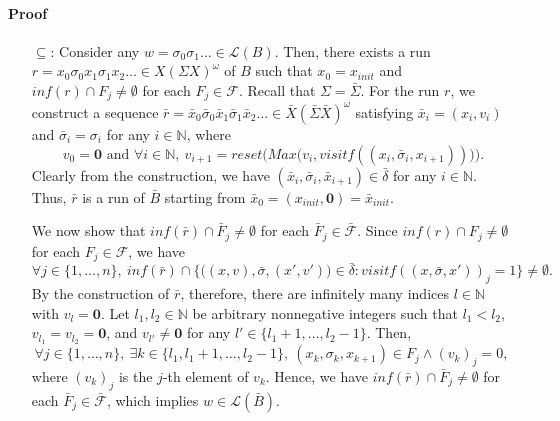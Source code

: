 \paragraph{Proof}
\begin{itemize}
	\item[$ \subseteq $:]
	Consider any $ w = \sigma_0 \sigma_1 \ldots \in \mathcal{L}(B) $.
	Then, there exists a run $ r = x_0 \sigma_0 x_1 \sigma_1 x_2 \ldots \in X(\Sigma X)^\omega $ of $ B $ such that $ x_0 = x_{init} $ and $ inf(r) \cap F_j \neq \emptyset $ for each $ F_j \in \mathcal{F} $.
	Recall that $ \Sigma = \bar{\Sigma} $.
	For the run $ r $, we construct a sequence $ \bar{r} = \bar{x}_0 \bar{\sigma}_0 \bar{x}_1 \bar{\sigma}_1 \bar{x}_2 \ldots \in \bar{X}(\bar{\Sigma} \bar{X})^\omega $ satisfying $ \bar{x}_i = (x_i, {v}_i) $ and $ \bar{\sigma}_i = \sigma_i $ for any $ i \in \mathbb{N} $, where
	\[
	\ {v}_0 = \mathbf{0} \text{ and } \forall i \in \mathbb{N}, \ {v}_{i+1} = reset \Big( Max \big( {v}_i, visitf((x_i,\bar{\sigma}_i,x_{i+1})) \big) \Big).
	\]
	Clearly from the construction, we have $ (\bar{x}_i, \bar{\sigma}_i, \bar{x}_{i+1}) \in \bar{\delta} $ for any $ i \in \mathbb{N} $.
	Thus, $ \bar{r} $ is a run of $ \bar{B} $ starting from $ \bar{x}_0 = (x_{init}, \mathbf{0}) = \bar{x}_{init} $.

	We now show that $ inf(\bar{r}) \cap \bar{F}_j \neq \emptyset $ for each $ \bar{F}_j \in \bar{\mathcal{F}} $.
	Since $ inf(r) \cap F_j \neq \emptyset $ for each $ F_j \in \mathcal{F} $, we have
	\begin{equation*}
	\forall j \in \{ 1, \ldots, n \}, \
	inf(\bar{r}) \cap \{ \big((x, {v}), \bar{\sigma}, (x', {v}')\big) \in \bar{\delta}: visitf( (x, \bar{\sigma}, x'))_j = 1 \} \neq \emptyset.
	\end{equation*}
	By the construction of $ \bar{r} $, therefore, there are infinitely many indices $ l \in \mathbb{N} $ with $ v_l = \mathbf{0} $.
	Let $ l_1, l_2 \in \mathbb{N} $ be arbitrary nonnegative integers such that $ l_1 < l_2 $, $ v_{l_1} = v_{l_2} = \mathbf{0} $, and $ v_{l'} \neq \mathbf{0} $ for any $ l' \in \{ l_1+1, \ldots, l_2-1\} $.
	Then, %
	\[
	\forall j \in \{1, \ldots, n\}, \ \exists k \in \{  l_1, l_1+1, \ldots, l_2-1 \}, \
	(x_k, \sigma_k, x_{k+1}) \in F_j \land (v_k)_j = 0 ,
	\]
	where $ (v_k)_j $ is the $ j $-th element of $ v_k $.
	Hence, we have $ inf(\bar{r}) \cap \bar{F}_j \neq \emptyset $ for each $ \bar{F}_j \in \bar{\mathcal{F}} $, which implies $ w \in \mathcal{L}(\bar{B}) $.


\end{itemize}
